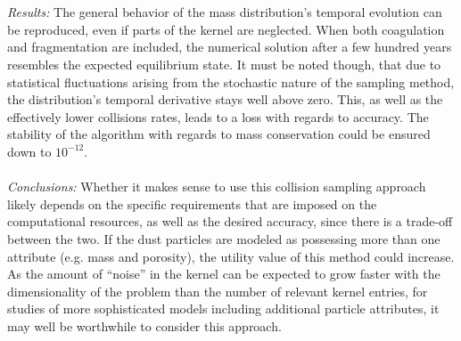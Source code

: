 \\ \ \\
\textit{Results:}
The general behavior of the mass distribution's temporal evolution can be reproduced, even if 
parts of the kernel are neglected.
When both coagulation and fragmentation are included, the numerical solution after a few hundred 
years resembles the expected equilibrium state.
It must be noted though, that
due to statistical fluctuations arising from the stochastic nature of the sampling method, 
the distribution's temporal 
derivative stays well above zero. This, as well as the effectively lower collisions rates,
leads to a loss with regards to accuracy. The stability of the algorithm with regards to mass 
conservation could be ensured down to $10^{-12}$.
\\ \ \\
\textit{Conclusions:}
Whether it makes sense to use this collision sampling approach likely depends on the specific 
requirements that are imposed on the computational resources, as well as the desired accuracy, since 
there is a trade-off between the two. 
If the dust particles are modeled as possessing more than one attribute (e.g. mass and porosity),
the utility value of this method could increase.
As the amount of ``noise'' in the kernel can be expected to grow faster with the dimensionality of 
the problem than the number of relevant kernel entries, for studies of more sophisticated models
including additional particle attributes, it may well be worthwhile to consider this approach.

